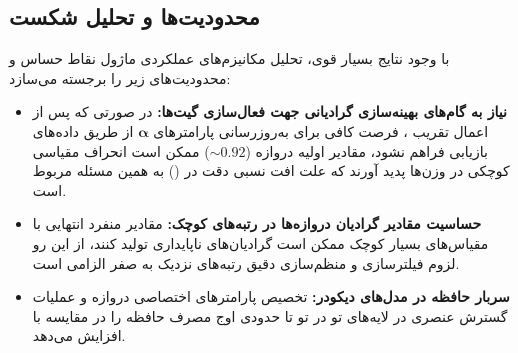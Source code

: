 \subsection{محدودیت‌ها و تحلیل شکست}
با وجود نتایج بسیار قوی، تحلیل مکانیزم‌های عملکردی ماژول نقاط حساس و محدودیت‌های زیر را برجسته می‌سازد:
\begin{itemize}
    \item \textbf{نیاز به گام‌های بهینه‌سازی گرادیانی جهت فعال‌سازی گیت‌ها:} در صورتی که پس از اعمال تقریب ، فرصت کافی برای به‌روزرسانی پارامترهای $\boldsymbol{\alpha}$ از طریق داده‌های بازیابی فراهم نشود، مقادیر اولیه دروازه ($\sim 0.92$) ممکن است انحراف مقیاسی کوچکی در وزن‌ها پدید آورند که علت افت نسبی دقت در  () به همین مسئله مربوط است.
    \item \textbf{حساسیت مقادیر گرادیان دروازه‌ها در رتبه‌های کوچک:} مقادیر منفرد انتهایی با مقیاس‌های بسیار کوچک ممکن است گرادیان‌های ناپایداری تولید کنند، از این رو لزوم فیلترسازی و منظم‌سازی دقیق رتبه‌های نزدیک به صفر الزامی است.
    \item \textbf{سربار حافظه در مدل‌های دیکودر:} تخصیص پارامترهای اختصاصی دروازه و عملیات گسترش عنصری در لایه‌های تو در تو تا حدودی اوج مصرف حافظه را در مقایسه با  افزایش می‌دهد.
\end{itemize}
